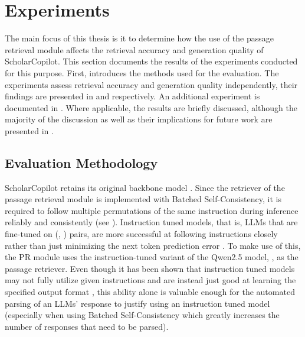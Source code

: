 \chapter{Experiments}\label{experiments}
The main focus of this thesis is it to determine how the use of the passage retrieval module affects the retrieval accuracy and generation quality of ScholarCopilot. This section documents the results of the experiments conducted for this purpose. First,  introduces the methods used for the evaluation. The experiments assess retrieval accuracy and generation quality independently, their findings are presented in  and  respectively. An additional experiment is documented in . Where applicable, the results are briefly discussed, although the majority of the discussion as well as their implications for future work are presented in .

\section{Evaluation Methodology}\label{evaluation-methodology}
ScholarCopilot retains its original backbone model  \cite{an2024qwen2}. Since the retriever of the passage retrieval module is implemented with Batched Self-Consistency, it is required to follow multiple permutations of the same instruction during inference reliably and consistently (see \cite{korikov2025batched}). Instruction tuned models, that is, LLMs that are fine-tuned on (, ) pairs, are more successful at following instructions closely rather than just minimizing the next token prediction error \cite{shengyu2025instruction}. To make use of this, the PR module uses the instruction-tuned variant of the Qwen2.5 model,  \cite{an2024qwen2}, as the passage retriever. Even though it has been shown that instruction tuned models may not fully utilize given instructions and are instead just good at learning the specified output format \cite{kung2023followInstructions}, this ability alone is valuable enough for the automated parsing of an LLMs' response to justify using an instruction tuned model (especially when using Batched Self-Consistency which greatly increases the number of responses that need to be parsed). 

